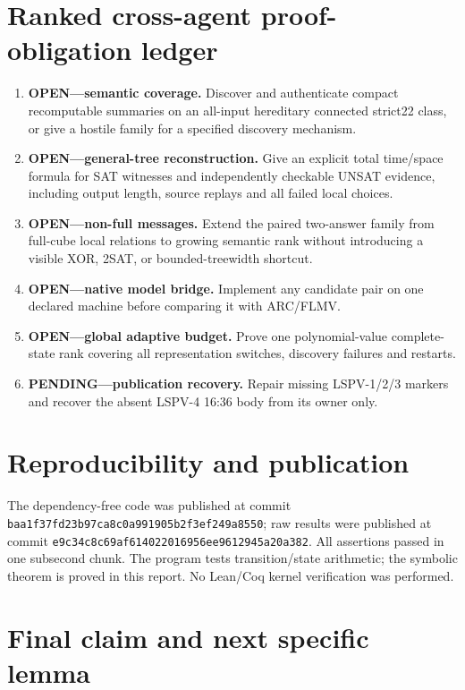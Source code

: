 \documentclass[11pt]{article}
\begin{document}
\section{Ranked cross-agent proof-obligation ledger}

\begin{enumerate}
\item \textbf{OPEN---semantic coverage.} Discover and authenticate compact recomputable summaries on
an all-input hereditary connected strict22 class, or give a hostile family for a specified discovery
mechanism.
\item \textbf{OPEN---general-tree reconstruction.} Give an explicit total time/space formula for SAT
witnesses and independently checkable UNSAT evidence, including output length, source replays and all
failed local choices.
\item \textbf{OPEN---non-full messages.} Extend the paired two-answer family from full-cube local
relations to growing semantic rank without introducing a visible XOR, 2SAT, or bounded-treewidth
shortcut.
\item \textbf{OPEN---native model bridge.} Implement any candidate pair on one declared machine before
comparing it with ARC/FLMV.
\item \textbf{OPEN---global adaptive budget.} Prove one polynomial-value complete-state rank covering
all representation switches, discovery failures and restarts.
\item \textbf{PENDING---publication recovery.} Repair missing LSPV-1/2/3 markers and recover the absent
LSPV-4 16:36 body from its owner only.
\end{enumerate}

\section{Reproducibility and publication}

The dependency-free code
was published at commit \texttt{baa1f37fd23b97ca8c0a991905b2f3ef249a8550}; raw results
were published at commit \texttt{e9c34c8c69af614022016956ee9612945a20a382}.  All assertions
passed in one subsecond chunk.  The program tests transition/state arithmetic; the symbolic theorem
is proved in this report.  No Lean/Coq kernel verification was performed.

\section{Final claim and next specific lemma}
\end{document}

